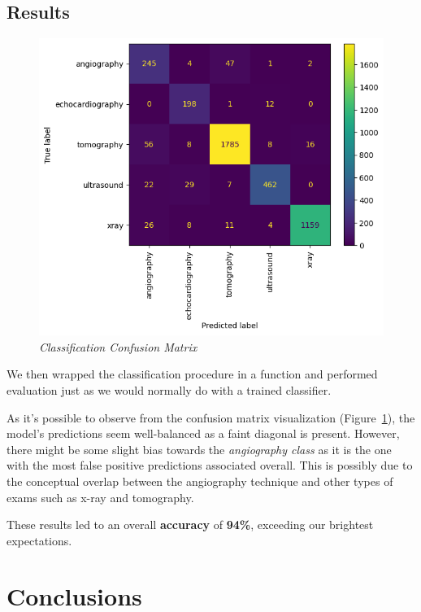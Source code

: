 \documentclass[10pt,twocolumn,letterpaper]{article}
\begin{document}
\subsection{Results}

\begin{figure}
   \centering
   \includegraphics[width=0.7\linewidth]{img/Classification_Result.png}
   \caption{\textit{Classification Confusion Matrix}}
   \label{fig:clasres}
\end{figure}

We then wrapped the classification procedure in a function and performed evaluation just as we would normally do with a trained classifier.

As it's possible to observe from the confusion matrix visualization (Figure\ \ref{fig:clasres}), the model's predictions seem well-balanced as a faint diagonal is present.
However, there might be some slight bias towards the \textit{angiography class} as it is the one with the most false positive predictions associated overall.
This is possibly due to the conceptual overlap between the angiography technique and other types of exams such as x-ray and tomography.

These results led to an overall \textbf{accuracy} of \textbf{94\%}, exceeding our brightest expectations.


\section{Conclusions}
\end{document}
